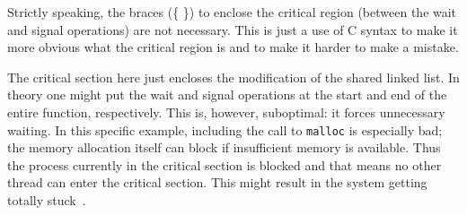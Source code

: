 Strictly speaking, the braces (\{ \}) to enclose the critical region (between the wait and signal operations) are not necessary. This is just a use of C syntax to make it more obvious what the critical region is and to make it harder to make a mistake.

The critical section here just encloses the modification of the shared linked list. In theory one might put the wait and signal operations at the start and end of the entire function, respectively. This is, however, suboptimal: it forces unnecessary waiting. In this specific example, including the call to \texttt{malloc} is especially bad; the memory allocation itself can block if insufficient memory is available. Thus the process currently in the critical section is blocked and that means no other thread can enter the critical section. This might result in the system getting totally stuck~\cite{mte241}.






